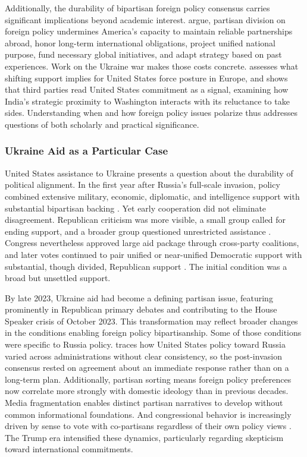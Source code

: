 Additionally, the durability of bipartisan foreign policy consensus carries significant implications beyond academic interest. \citet{bryanPrevalenceBipartisanshipUS2022} argue, partisan division on foreign policy undermines America's capacity to maintain reliable partnerships abroad, honor long-term international obligations, project unified national purpose, fund necessary global initiatives, and adapt strategy based on past experiences. Work on the Ukraine war makes those costs concrete. \citet{stewartRevisitingGlobalPosture2023} assesses what shifting support implies for United States force posture in Europe, and \citet{thakkarRussiaUkraineWarIndia2024} shows that third parties read United States commitment as a signal, examining how India's strategic proximity to Washington interacts with its reluctance to take sides. Understanding when and how foreign policy issues polarize thus addresses questions of both scholarly and practical significance.

\subsubsection{Ukraine Aid as a Particular Case}
United States assistance to Ukraine presents a question about the durability of political alignment. In the first year after Russia's full-scale invasion, policy combined extensive military, economic, diplomatic, and intelligence support with substantial bipartisan backing \citep{harrisWarUkrainePolarised2023a}. Yet early cooperation did not eliminate disagreement. Republican criticism was more visible, a small group called for ending support, and a broader group questioned unrestricted assistance \citep{harrisWarUkrainePolarised2023a}. Congress nevertheless approved large aid package through cross-party coalitions, and later votes continued to pair unified or near-unified Democratic support with substantial, though divided, Republican support \citep{tamaBipartisanshipPutTest2025}. The initial condition was a broad but unsettled support.

By late 2023, Ukraine aid had become a defining partisan issue, featuring prominently in Republican primary debates and contributing to the House Speaker crisis of October 2023. This transformation may reflect broader changes in the conditions enabling foreign policy bipartisanship. Some of those conditions were specific to Russia policy. \citet{podrazaInconsistencyUSPolicy2025} traces how United States policy toward Russia varied across administrations without clear consistency, so the post-invasion consensus rested on agreement about an immediate response rather than on a long-term plan. Additionally, partisan sorting means foreign policy preferences now correlate more strongly with domestic ideology than in previous decades. Media fragmentation enables distinct partisan narratives to develop without common informational foundations. And congressional behavior is increasingly driven by sense to vote with co-partisans regardless of their own policy views \citep{leeInsecureMajoritiesCongress2016,theriaultGingrichSenatorsRoots2013}. The Trump era intensified these dynamics, particularly regarding skepticism toward international commitments.

